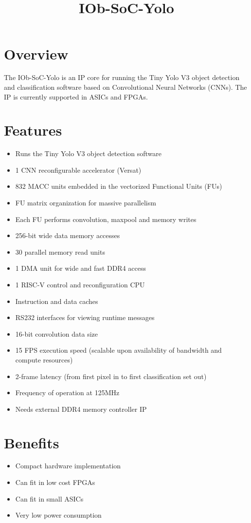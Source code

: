 \documentclass[twocolumn]{iob_pb}
\title{IOb-SoC-Yolo}
\newcommand\BackgroundPic{%
\put(0,0){%
\parbox[b][\paperheight]{\paperwidth}{%
\vfill
\centering
\texttt{[image: bg.png]}%
\vfill
}}}
\begin{document}
\AddToShipoutPicture*{\BackgroundPic}

\section*{\textcolor[rgb]{0,0,0}{Overview}}

The IOb-SoC-Yolo is an IP core for running the Tiny Yolo V3 object detection and
classification software based on Convolutional Neural Networks (CNNs). The IP is
currently supported in ASICs and FPGAs.

\section*{\textcolor[rgb]{0,0,0}{Features}}
\begin{itemize}
\item Runs the Tiny Yolo V3 object detection software
\item 1 CNN reconfigurable accelerator (Versat)
\item 832 MACC units embedded in the vectorized Functional Units (FUs)
\item FU matrix organization for massive parallelism
\item Each FU performs convolution, maxpool and memory writes
\item 256-bit wide data memory accesses
\item 30 parallel memory read units
\item 1 DMA unit for wide and fast DDR4 access 
\item 1 RISC-V control and reconfiguration CPU
\item Instruction and data caches
\item RS232 interfaces for viewing runtime messages
\item 16-bit convolution data size
\item 15 FPS execution speed (scalable upon availability of bandwidth and compute resources)
\item 2-frame latency (from first pixel in to first classification set out)
\item Frequency of operation at 125MHz
\item Needs external DDR4 memory controller IP
\end{itemize}

\section*{\textcolor[rgb]{0,0,0}{Benefits}}
\begin{itemize}
\item Compact hardware implementation
\item Can fit in low cost FPGAs
\item Can fit in small ASICs 
\item Very low power consumption
\end{itemize}
\end{document}
